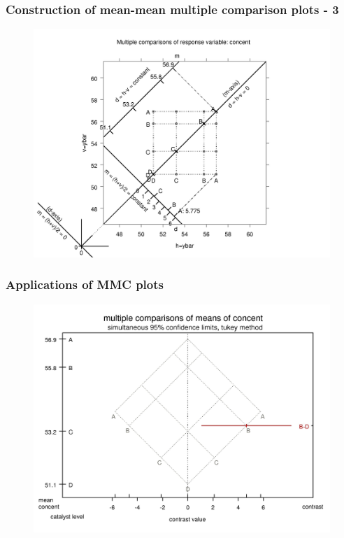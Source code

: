 \documentclass{beamer}
\begin{document}
\begin{frame}
\frametitle{Construction of mean-mean multiple comparison plots - 3}
\begin{figure}
	\centering
		\includegraphics[width=1.00\textwidth]{mmc1-b.jpg}
	\label{fig:MMC3}
\end{figure}
\end{frame}


\begin{frame}
\frametitle{Applications of MMC plots}
\begin{figure}
	\centering
		\includegraphics[width=1.00\textwidth]{mmc2.jpg}
	\label{fig:MMC4}
\end{figure}
\end{frame}
\end{document}
